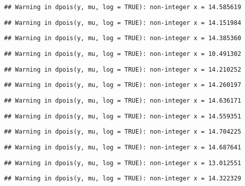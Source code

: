 \documentclass[
]{article}
\begin{document}
\begin{verbatim}
## Warning in dpois(y, mu, log = TRUE): non-integer x = 14.585619
\end{verbatim}

\begin{verbatim}
## Warning in dpois(y, mu, log = TRUE): non-integer x = 14.151984
\end{verbatim}

\begin{verbatim}
## Warning in dpois(y, mu, log = TRUE): non-integer x = 14.385360
\end{verbatim}

\begin{verbatim}
## Warning in dpois(y, mu, log = TRUE): non-integer x = 10.491302
\end{verbatim}

\begin{verbatim}
## Warning in dpois(y, mu, log = TRUE): non-integer x = 14.210252
\end{verbatim}

\begin{verbatim}
## Warning in dpois(y, mu, log = TRUE): non-integer x = 14.260197
\end{verbatim}

\begin{verbatim}
## Warning in dpois(y, mu, log = TRUE): non-integer x = 14.636171
\end{verbatim}

\begin{verbatim}
## Warning in dpois(y, mu, log = TRUE): non-integer x = 14.559351
\end{verbatim}

\begin{verbatim}
## Warning in dpois(y, mu, log = TRUE): non-integer x = 14.704225
\end{verbatim}

\begin{verbatim}
## Warning in dpois(y, mu, log = TRUE): non-integer x = 14.687641
\end{verbatim}

\begin{verbatim}
## Warning in dpois(y, mu, log = TRUE): non-integer x = 13.012551
\end{verbatim}

\begin{verbatim}
## Warning in dpois(y, mu, log = TRUE): non-integer x = 14.322329
\end{verbatim}
\end{document}
